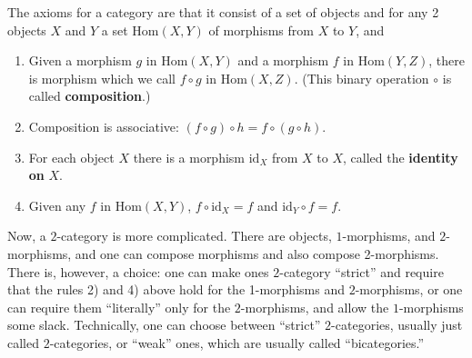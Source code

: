 \documentclass[12pt]{article}
\def\tightlist{}
\begin{document}
The axioms for a category are that it consist of a set of objects and
for any 2 objects \(X\) and \(Y\) a set \(\mathrm{Hom}(X,Y)\) of
morphisms from \(X\) to \(Y\), and

\begin{enumerate}
\def\labelenumi{\arabic{enumi}.}
\tightlist
\item
  Given a morphism \(g\) in \(\mathrm{Hom}(X,Y)\) and a morphism \(f\)
  in \(\mathrm{Hom}(Y,Z)\), there is morphism which we call
  \(f \circ g\) in \(\mathrm{Hom}(X,Z)\). (This binary operation
  \(\circ\) is called \textbf{composition}.)
\item
  Composition is associative:
  \((f \circ g) \circ h = f \circ (g \circ h)\).
\item
  For each object \(X\) there is a morphism \(\mathrm{id}_X\) from \(X\)
  to \(X\), called the \textbf{identity on} \(X\).
\item
  Given any \(f\) in \(\mathrm{Hom}(X,Y)\),
  \(f \circ \mathrm{id}_X = f\) and \(\mathrm{id}_Y \circ f = f\).
\end{enumerate}

Now, a \(2\)-category is more complicated. There are objects,
\(1\)-morphisms, and \(2\)-morphisms, and one can compose morphisms and
also compose 2-morphisms. There is, however, a choice: one can make ones
\(2\)-category ``strict'' and require that the rules 2) and 4) above
hold for the 1-morphisms and \(2\)-morphisms, or one can require them
``literally'' only for the \(2\)-morphisms, and allow the
\(1\)-morphisms some slack. Technically, one can choose between
``strict'' \(2\)-categories, usually just called \(2\)-categories, or
``weak'' ones, which are usually called ``bicategories.''
\end{document}
